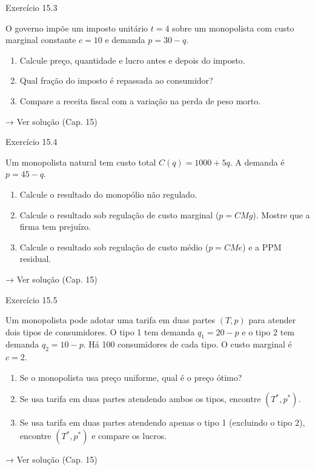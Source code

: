 \documentclass[11pt,twoside,openright]{book}
\begin{document}
\begin{exresolvidobox}{Exercício 15.3}

O governo impõe um imposto unitário \(t = 4\) sobre um monopolista com
custo marginal constante \(c = 10\) e demanda \(p = 30 - q\).

\begin{enumerate}
\def\labelenumi{\alph{enumi})}
\item
  Calcule preço, quantidade e lucro antes e depois do imposto.
\item
  Qual fração do imposto é repassada ao consumidor?
\item
  Compare a receita fiscal com a variação na perda de peso morto.
\end{enumerate}

→ Ver solução (Cap. 15)

\end{exresolvidobox}

\begin{exresolvidobox}{Exercício 15.4}

Um monopolista natural tem custo total \(C(q) = 1000 + 5q\). A demanda é
\(p = 45 - q\).

\begin{enumerate}
\def\labelenumi{\alph{enumi})}
\item
  Calcule o resultado do monopólio não regulado.
\item
  Calcule o resultado sob regulação de custo marginal (\(p = CMg\)).
  Mostre que a firma tem prejuízo.
\item
  Calcule o resultado sob regulação de custo médio (\(p = CMe\)) e a PPM
  residual.
\end{enumerate}

→ Ver solução (Cap. 15)

\end{exresolvidobox}

\begin{exresolvidobox}{Exercício 15.5}

Um monopolista pode adotar uma tarifa em duas partes \((T, p)\) para
atender dois tipos de consumidores. O tipo 1 tem demanda
\(q_1 = 20 - p\) e o tipo 2 tem demanda \(q_2 = 10 - p\). Há 100
consumidores de cada tipo. O custo marginal é \(c = 2\).

\begin{enumerate}
\def\labelenumi{\alph{enumi})}
\item
  Se o monopolista usa preço uniforme, qual é o preço ótimo?
\item
  Se usa tarifa em duas partes atendendo ambos os tipos, encontre
  \((T^*, p^*)\).
\item
  Se usa tarifa em duas partes atendendo apenas o tipo 1 (excluindo o
  tipo 2), encontre \((T^*, p^*)\) e compare os lucros.
\end{enumerate}

→ Ver solução (Cap. 15)

\end{exresolvidobox}
\end{document}

